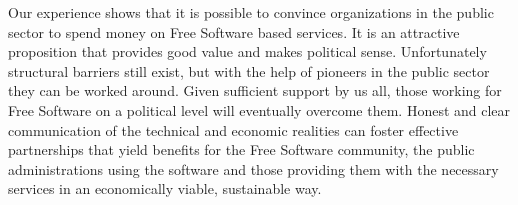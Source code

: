 Our experience shows that it is possible to convince organizations in
the public sector to spend money on Free Software based services. It is
an attractive proposition that provides good value and makes political
sense. Unfortunately structural barriers still exist, but with the help
of pioneers in the public sector they can be worked around. Given
sufficient support by us all, those working for Free Software on a political
level will eventually overcome them. Honest and clear
communication of the technical and economic realities can foster
effective partnerships that yield benefits for the Free Software community,
the public administrations using the software and those providing them
with the necessary services in an economically viable, sustainable way.

